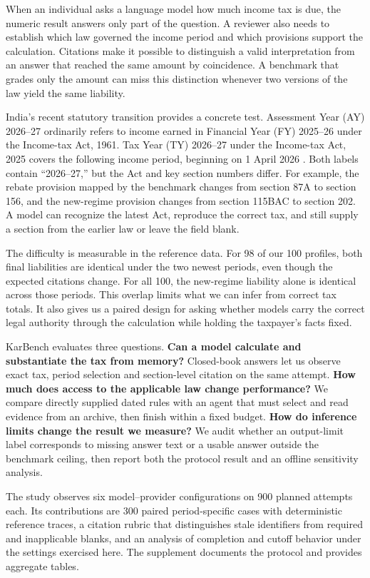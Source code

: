 \documentclass[10pt,letterpaper,twocolumn]{article}
\begin{document}
When an individual asks a language model how much income tax is due, the numeric result answers only part of the question. A reviewer also needs to establish which law governed the income period and which provisions support the calculation. Citations make it possible to distinguish a valid interpretation from an answer that reached the same amount by coincidence. A benchmark that grades only the amount can miss this distinction whenever two versions of the law yield the same liability.

India's recent statutory transition provides a concrete test. Assessment Year (AY) 2026--27 ordinarily refers to income earned in Financial Year (FY) 2025--26 under the Income-tax Act, 1961. Tax Year (TY) 2026--27 under the Income-tax Act, 2025 covers the following income period, beginning on 1 April 2026 \cite{act2025,taxfaq,pib}. Both labels contain ``2026--27,'' but the Act and key section numbers differ. For example, the rebate provision mapped by the benchmark changes from section 87A to section 156, and the new-regime provision changes from section 115BAC to section 202. A model can recognize the latest Act, reproduce the correct tax, and still supply a section from the earlier law or leave the field blank.

The difficulty is measurable in the reference data. For 98 of our 100 profiles, both final liabilities are identical under the two newest periods, even though the expected citations change. For all 100, the new-regime liability alone is identical across those periods. This overlap limits what we can infer from correct tax totals. It also gives us a paired design for asking whether models carry the correct legal authority through the calculation while holding the taxpayer's facts fixed.

KarBench evaluates three questions. \textbf{Can a model calculate and substantiate the tax from memory?} Closed-book answers let us observe exact tax, period selection and section-level citation on the same attempt. \textbf{How much does access to the applicable law change performance?} We compare directly supplied dated rules with an agent that must select and read evidence from an archive, then finish within a fixed budget. \textbf{How do inference limits change the result we measure?} We audit whether an output-limit label corresponds to missing answer text or a usable answer outside the benchmark ceiling, then report both the protocol result and an offline sensitivity analysis.

The study observes six model--provider configurations on 900 planned attempts each. Its contributions are 300 paired period-specific cases with deterministic reference traces, a citation rubric that distinguishes stale identifiers from required and inapplicable blanks, and an analysis of completion and cutoff behavior under the settings exercised here. The supplement documents the protocol and provides aggregate tables.
\end{document}
